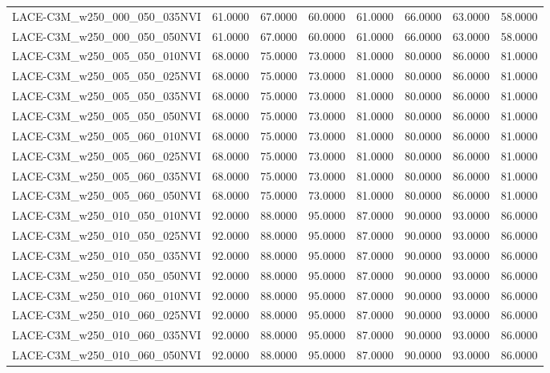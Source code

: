 \begin{table}
\begin{tabular}{lrrrrrrr}
LACE-C3M\_w250\_000\_050\_035NVI & 61.0000 & 67.0000 & 60.0000 & 61.0000 & 66.0000 & 63.0000 & 58.0000 \\
LACE-C3M\_w250\_000\_050\_050NVI & 61.0000 & 67.0000 & 60.0000 & 61.0000 & 66.0000 & 63.0000 & 58.0000 \\
LACE-C3M\_w250\_005\_050\_010NVI & 68.0000 & 75.0000 & 73.0000 & 81.0000 & 80.0000 & 86.0000 & 81.0000 \\
LACE-C3M\_w250\_005\_050\_025NVI & 68.0000 & 75.0000 & 73.0000 & 81.0000 & 80.0000 & 86.0000 & 81.0000 \\
LACE-C3M\_w250\_005\_050\_035NVI & 68.0000 & 75.0000 & 73.0000 & 81.0000 & 80.0000 & 86.0000 & 81.0000 \\
LACE-C3M\_w250\_005\_050\_050NVI & 68.0000 & 75.0000 & 73.0000 & 81.0000 & 80.0000 & 86.0000 & 81.0000 \\
LACE-C3M\_w250\_005\_060\_010NVI & 68.0000 & 75.0000 & 73.0000 & 81.0000 & 80.0000 & 86.0000 & 81.0000 \\
LACE-C3M\_w250\_005\_060\_025NVI & 68.0000 & 75.0000 & 73.0000 & 81.0000 & 80.0000 & 86.0000 & 81.0000 \\
LACE-C3M\_w250\_005\_060\_035NVI & 68.0000 & 75.0000 & 73.0000 & 81.0000 & 80.0000 & 86.0000 & 81.0000 \\
LACE-C3M\_w250\_005\_060\_050NVI & 68.0000 & 75.0000 & 73.0000 & 81.0000 & 80.0000 & 86.0000 & 81.0000 \\
LACE-C3M\_w250\_010\_050\_010NVI & 92.0000 & 88.0000 & 95.0000 & 87.0000 & 90.0000 & 93.0000 & 86.0000 \\
LACE-C3M\_w250\_010\_050\_025NVI & 92.0000 & 88.0000 & 95.0000 & 87.0000 & 90.0000 & 93.0000 & 86.0000 \\
LACE-C3M\_w250\_010\_050\_035NVI & 92.0000 & 88.0000 & 95.0000 & 87.0000 & 90.0000 & 93.0000 & 86.0000 \\
LACE-C3M\_w250\_010\_050\_050NVI & 92.0000 & 88.0000 & 95.0000 & 87.0000 & 90.0000 & 93.0000 & 86.0000 \\
LACE-C3M\_w250\_010\_060\_010NVI & 92.0000 & 88.0000 & 95.0000 & 87.0000 & 90.0000 & 93.0000 & 86.0000 \\
LACE-C3M\_w250\_010\_060\_025NVI & 92.0000 & 88.0000 & 95.0000 & 87.0000 & 90.0000 & 93.0000 & 86.0000 \\
LACE-C3M\_w250\_010\_060\_035NVI & 92.0000 & 88.0000 & 95.0000 & 87.0000 & 90.0000 & 93.0000 & 86.0000 \\
LACE-C3M\_w250\_010\_060\_050NVI & 92.0000 & 88.0000 & 95.0000 & 87.0000 & 90.0000 & 93.0000 & 86.0000 \\

\end{tabular}
\end{table}

